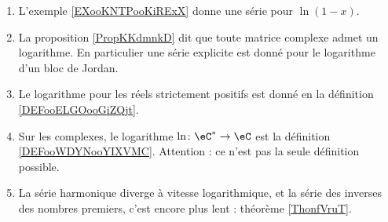 \begin{enumerate}
    \item
        L'exemple \ref{EXooKNTPooKiRExX} donne une série pour \( \ln(1-x)\).
    \item
        La proposition \ref{PropKKdmnkD} dit que toute matrice complexe admet un logarithme. En particulier une série explicite est donné pour le logarithme d'un bloc de Jordan.
    \item
        Le logarithme pour les réels strictement positifs est donné en la définition \ref{DEFooELGOooGiZQjt}.
    \item
        Sur les complexes, le logarithme \( \ln \colon \eC^*\to \eC\) est la définition \ref{DEFooWDYNooYIXVMC}. Attention : ce n'est pas la seule définition possible.
    \item
        La série harmonique diverge à vitesse logarithmique, et la série des inverses des nombres premiers, c'est encore plus lent : théorème \ref{ThonfVruT}.
\end{enumerate}
